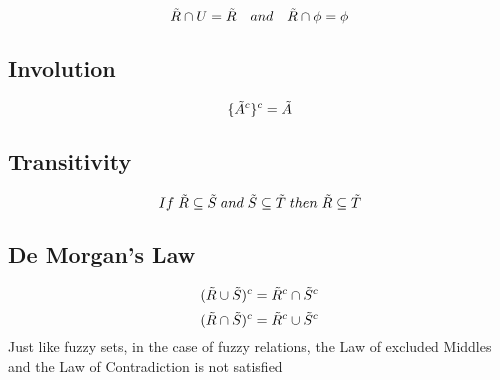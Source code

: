 \documentclass{article}
\begin{document}
\begin{equation}
    \Tilde{R}\cap U=\Tilde{R}\quad and\quad 
    \Tilde{R}\cap\phi=\phi
\end{equation}
\subsection{Involution}
\begin{equation}
 \{\Tilde{A}^c\}^c=\Tilde{A}
\end{equation}
\subsection{Transitivity}
\begin{equation}
 If\hspace{0.1cm} \Tilde{R}\subseteq\Tilde{S}\hspace{0.1cm} and\hspace{0.1cm} \Tilde{S}\subseteq\Tilde{T}\hspace{0.1cm} then\hspace{0.1cm} \Tilde{R}\subseteq\Tilde{T} 
\end{equation}
\subsection{De Morgan's Law}
\begin{equation}
({\Tilde{R}\cup\Tilde{S}})^c= \Tilde{R}^c \cap\Tilde{S}^c
\end{equation}
\begin{equation}
({\Tilde{R}\cap\Tilde{S}})^c= \Tilde{R}^c \cup\Tilde{S}^c
\end{equation}
Just like fuzzy sets, in the case of fuzzy relations, the Law of excluded Middles and the Law of Contradiction is not satisfied 
\end{document}
